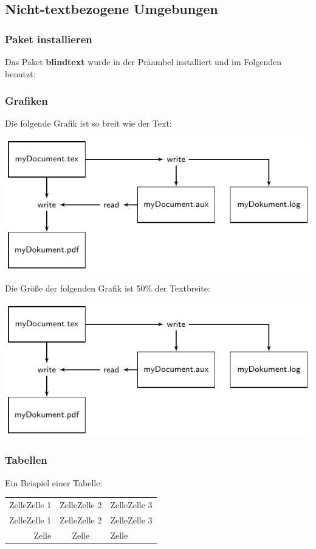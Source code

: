 \documentclass[10pt,paper=a4,abstracton]{scrartcl}
\begin{document}
\subsection{Nicht-textbezogene Umgebungen}


\subsubsection{Paket installieren}

Das Paket \textbf{blindtext} wurde in der Präambel installiert und im Folgenden benutzt:


\blindtext


\subsubsection{Grafiken}

Die folgende Grafik ist so breit wie der Text:

\includegraphics[width=\linewidth]{LaTeX-flowchart-1.pdf}


Die Größe der folgenden Grafik ist 50\% der Textbreite:

\includegraphics[width=.5\linewidth]{LaTeX-flowchart-1}


\subsubsection{Tabellen}

Ein Beispiel einer Tabelle: 
\begin{tabular}[t]{rc|l|}
	ZelleZelle 1 & ZelleZelle 2 & ZelleZelle 3 \\
	ZelleZelle 1 & ZelleZelle 2 & ZelleZelle 3 \\
	\hline
	Zelle & Zelle & Zelle \\
\end{tabular}
\end{document}

